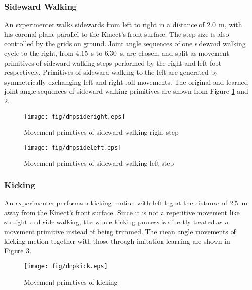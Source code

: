 \subsubsection{Sideward Walking}
An experimenter walks sidewards from left to right in a distance of \SI{2.0}{\meter}, with his coronal plane parallel to the Kinect's front surface. The step size is also controlled by the grids on ground. Joint angle sequences of one sideward walking cycle to the right, from \SI{4.15}{\second} to \SI{6.30}{\second}, are chosen, and split as movement primitives of  sideward walking steps performed by the right and left foot respectively. Primitives of sideward walking to the left are generated by symmetrically exchanging left and right roll movements. The original and learned joint angle sequences of sideward walking primitives are shown from Figure {\ref{dmpsideright}} and {\ref{dmpsideleft}}.

\begin{figure}[h]
	\centering
	\texttt{[image: fig/dmpsideright.eps]}
	\caption{Movement primitives of sideward walking right step}
	\label{dmpsideright}
\end{figure}

\begin{figure}[h]
	\centering
	\texttt{[image: fig/dmpsideleft.eps]}
	\caption{Movement primitives of sideward walking left step}
	\label{dmpsideleft}
\end{figure}

\subsubsection{Kicking}
An experimenter performs a kicking motion with left leg at the distance of \SI{2.5}{\meter} away from the Kinect's front surface. Since it is not a repetitive movement like straight and side walking, the whole kicking process is directly treated as a movement primitive instead of being trimmed. The mean angle movements of kicking motion together with those through imitation learning are shown in Figure {\ref{dmpkick}}.

\begin{figure}[h]
	\centering
	\texttt{[image: fig/dmpkick.eps]}
	\caption{Movement primitives of kicking}
	\label{dmpkick}
\end{figure}

 


